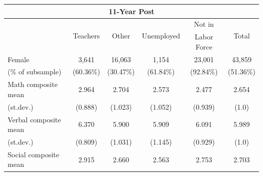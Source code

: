 \documentclass[onehalfspacing,11pt]{article}
\begin{document}
	\begin{table}[h!]
		\centering 
		\begin{tabular}{lccccc}
			\toprule
			\multicolumn{6}{c}{11-Year Post} \\
			\midrule
			& \multirow{2}{*}{Teachers} & \multirow{2}{*}{Other} & \multirow{2}{*}{Unemployed}& Not in & \multirow{2}{*}{Total}\\
			&  &  & & Labor Force &  \\
			\midrule
			Female & 3,641 & 16,063 & 1,154 & 23,001 & 43,859\\
			\quad (\% of subsample) & (60.36\%) & (30.47\%) & (61.84\%) & (92.84\%) &(51.36\%)\\
			\midrule
			Math composite mean & 2.964 & 2.704 & 2.573 & 2.477 & 2.654\\
			\quad (st.dev.) & (0.888) & (1.023) & (1.052) & (0.939) & (1.0) \\
			\midrule
			Verbal composite mean & 6.370 & 5.900 & 5.909 & 6.091 & 5.989\\
			\quad (st.dev.) & (0.809) & (1.031) & (1.145) & (0.929) & (1.0)\\
			\midrule
			Social composite mean & 2.915 & 2.660 & 2.563 & 2.753 & 2.703\\

\end{tabular}
\end{table}
\end{document}
